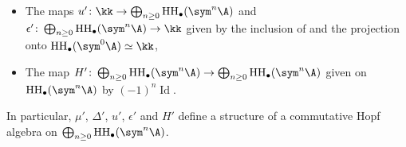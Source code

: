 \documentclass[12pt,a4paper,reqno]{amsart}
\DeclareMathOperator{\id}{Id}
\DeclareMathOperator{\hochhom}{{HH}}
\DeclareMathOperator{\hochcx}{{HC}}
\DeclareMathOperator\awmap{{AW}}
\begin{document}
\begin{theorem}
\begin{itemize}
\begin{small}
\begin{equation*}
\begin{tikzcd}
&
\hochcx_\bullet\left(\A^{\otimes n} \rtimes (S_I \times S_{\bar{I}})\right)
\ar{d}{\simeq}
&
\\
&
\hochcx_\bullet(\sym^{|I|} \A \otimes \sym^{n-|I|} \A)
\ar{r}{\awmap}
&
\hochcx_\bullet(\sym^{|I|} \A) \otimes \hochcx_\bullet(\sym^{n-|I|} \A), 
\end{tikzcd}
\end{equation*}
\end{small}
where $\bar{I} =  \left\{ 1, \dots, n \right\} \setminus I$, 
where $S_I, S_{\bar{I}} < S_n$ 
are the subgroups that only permute 
the elements of $I$ and of $\bar{I}$, and where $|I|$ is the size of $I$. 
\item The maps $u'\colon \kk \rightarrow 
\bigoplus_{n \geq 0} \hochhom_\bullet(\sym^n \A)$
and $\epsilon'\colon 
\bigoplus_{n \geq 0} \hochhom_\bullet(\sym^n \A) \rightarrow \kk$ 
given by the inclusion of and the projection onto 
$\hochhom_\bullet(\sym^0 \A) \simeq \kk$, 
\item The map $H'\colon 
\bigoplus_{n \geq 0} \hochhom_\bullet(\sym^n \A) 
\rightarrow 
\bigoplus_{n \geq 0} \hochhom_\bullet(\sym^n \A)$
given on $\hochhom_\bullet(\sym^n \A)$ by $(-1)^n \id$. 
\end{itemize}
In particular, $\mu'$, $\Delta'$, $u'$, $\epsilon'$ and $H'$ define a
structure of a commutative Hopf algebra on 
$\bigoplus_{n \geq 0} \hochhom_\bullet(\sym^n \A)$. 
\end{theorem}
\end{document}
